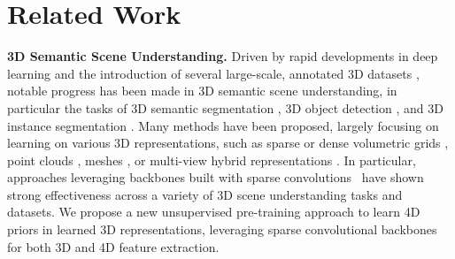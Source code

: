 \documentclass[runningheads]{llncs}
\makeatletter
\newcommand{\yjnote}[1]{\textcolor{magenta}{[Yujin:\@ #1]}}
\makeatother
\begin{document}
\begin{comment}
Our main contributions are summarized as follows:
\vspace{-0.3cm}
\begin{itemize}
\setlength{\itemsep}{0pt}
\setlength{\parsep}{0pt}
\setlength{\parskip}{0pt}
\setlength{\topsep}{0pt}
\setlength{\partopsep}{0pt}
\item [] We present a dynamic-invariant representation learning framework for 3D scene understanding.
\item [] \yjnote{Some technical contributions.} 
\item [] Experimental results show the pre-trained model can improve the performance of multiple static 3D understanding tasks such as segmentation and detection.
\end{itemize}
\vspace{-0.3cm}
\end{comment}
\vspace{-0.1in}
 
\section{Related Work}

\noindent \textbf{3D Semantic Scene Understanding.}
Driven by rapid developments in deep learning and the introduction of several large-scale, annotated 3D datasets \cite{chang2017matterport3d,dai2017scannet,geiger2012we}, notable progress has been made in 3D semantic scene understanding, in particular the tasks of 3D semantic segmentation \cite{choy20194d,dai2017scannet,dai20183dmv,graham20183d,hu2021bidirectional,huang2019texturenet,nekrasov2021mix3d,qi2017pointnet++,rozenberszki2022language}, 3D object detection \cite{nie2021rfd,qi2020imvotenet,qi2019deep,xie2020mlcvnet,zhang2020h3dnet}, and 3D instance segmentation \cite{engelmann20203d,han2020occuseg,hou20193d,jiang2020pointgroup,zhang2021point}. 
Many methods have been proposed, largely focusing on learning on various 3D representations, such as sparse or dense volumetric grids \cite{choy20194d,dai2017scannet,graham20183d}, point clouds \cite{jiang2020pointgroup,qi2019deep,qi2017pointnet,qi2017pointnet++}, meshes \cite{huang2019texturenet,schult2020dualconvmesh}, or multi-view hybrid representations \cite{dai20183dmv,kundu2020virtual}.
In particular, approaches leveraging backbones built with sparse convolutions~\cite{choy20194d,graham20183d} have shown strong effectiveness across a variety of 3D scene understanding tasks and datasets.
We propose a new unsupervised pre-training approach to learn 4D priors in learned 3D representations, leveraging sparse convolutional backbones for both 3D and 4D feature extraction.
\end{document}

